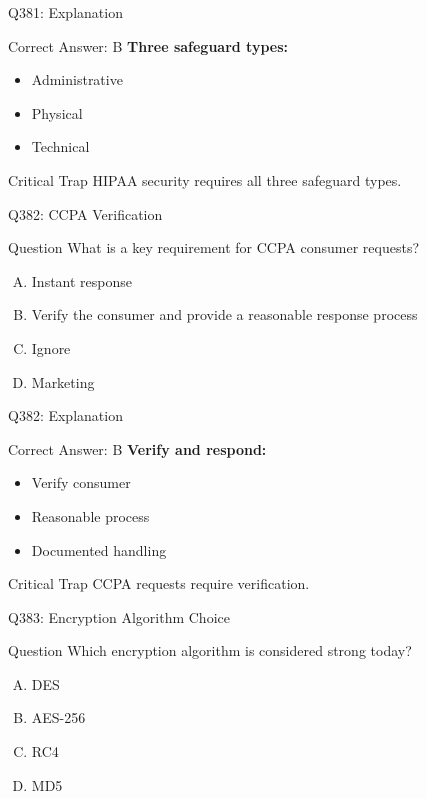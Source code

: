 \documentclass{beamer}
\begin{document}
	\begin{frame}{Q381: Explanation}
		\begin{block}{Correct Answer: B}
			\textbf{Three safeguard types:}
			\begin{itemize}
				\item Administrative
				\item Physical
				\item Technical
			\end{itemize}
		\end{block}
		\begin{alertblock}{Critical Trap}
			HIPAA security requires all three safeguard types.
		\end{alertblock}
	\end{frame}
	
	\begin{frame}{Q382: CCPA Verification}
		\begin{block}{Question}
			What is a key requirement for CCPA consumer requests?
		\end{block}
		\begin{enumerate}[(A)]
			\item Instant response
			\item Verify the consumer and provide a reasonable response process
			\item Ignore
			\item Marketing
		\end{enumerate}
	\end{frame}
	
	\begin{frame}{Q382: Explanation}
		\begin{block}{Correct Answer: B}
			\textbf{Verify and respond:}
			\begin{itemize}
				\item Verify consumer
				\item Reasonable process
				\item Documented handling
			\end{itemize}
		\end{block}
		\begin{alertblock}{Critical Trap}
			CCPA requests require verification.
		\end{alertblock}
	\end{frame}
	
	\begin{frame}{Q383: Encryption Algorithm Choice}
		\begin{block}{Question}
			Which encryption algorithm is considered strong today?
		\end{block}
		\begin{enumerate}[(A)]
			\item DES
			\item AES-256
			\item RC4
			\item MD5
		\end{enumerate}
	\end{frame}
	
\end{document}
